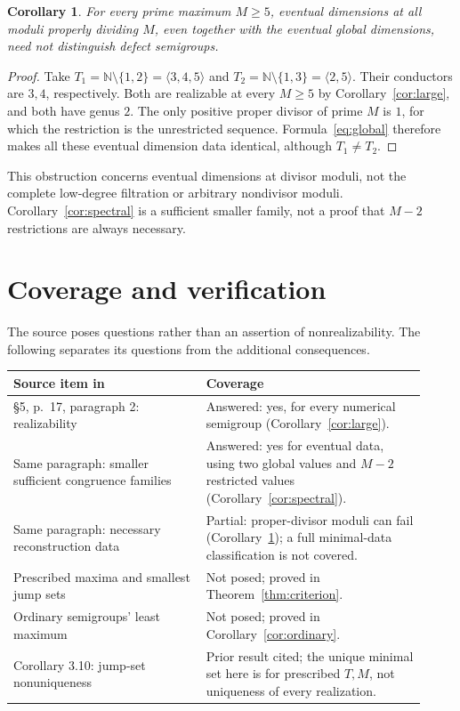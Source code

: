\documentclass[11pt]{article}
\newtheorem{corollary}[theorem]{Corollary}
\newcommand{\N}{\mathbb N}
\newcommand{\gen}[1]{\langle #1\rangle}
\begin{document}
\begin{corollary}\label{cor:obstruction}
For every prime maximum $M\ge5$, eventual dimensions at all moduli
properly dividing $M$, even together with the eventual global dimensions,
need not distinguish defect semigroups.
\end{corollary}
\begin{proof}
Take $T_1=\N\setminus\{1,2\}=\gen{3,4,5}$ and
$T_2=\N\setminus\{1,3\}=\gen{2,5}$.
Their conductors are $3,4$, respectively. Both are realizable at every
$M\ge5$ by Corollary~\ref{cor:large}, and both have genus $2$.
The only positive proper divisor of prime $M$ is $1$, for which the
restriction is the unrestricted sequence. Formula~\eqref{eq:global}
therefore makes all these eventual dimension data identical, although
$T_1\ne T_2$.
\end{proof}
This obstruction concerns eventual dimensions at divisor moduli, not
the complete low-degree filtration or arbitrary nondivisor moduli.
Corollary~\ref{cor:spectral} is a sufficient smaller family, not a proof
that $M-2$ restrictions are always necessary.

\section{Coverage and verification}
The source poses questions rather than an assertion of nonrealizability.
The following separates its questions from the additional consequences.
\begin{center}
\small
\begin{tabular}{@{}p{0.43\linewidth}p{0.49\linewidth}@{}}
\toprule
Source item in \cite{VC} & Coverage\\
\midrule
\S5, p.~17, paragraph 2: realizability & Answered: yes, for every numerical
semigroup (Corollary~\ref{cor:large}).\\[3pt]
Same paragraph: smaller sufficient congruence families & Answered: yes
for eventual data, using two global values and $M-2$ restricted values
(Corollary~\ref{cor:spectral}).\\[3pt]
Same paragraph: necessary reconstruction data & Partial: proper-divisor
moduli can fail (Corollary~\ref{cor:obstruction}); a full minimal-data
classification is not covered.\\[3pt]
Prescribed maxima and smallest jump sets & Not posed; proved in
Theorem~\ref{thm:criterion}.\\[3pt]
Ordinary semigroups' least maximum & Not posed; proved in
Corollary~\ref{cor:ordinary}.\\[3pt]
Corollary 3.10: jump-set nonuniqueness & Prior result cited; the unique
minimal set here is for prescribed $T,M$, not uniqueness of every realization.\\
\bottomrule
\end{tabular}
\end{center}
\end{document}
